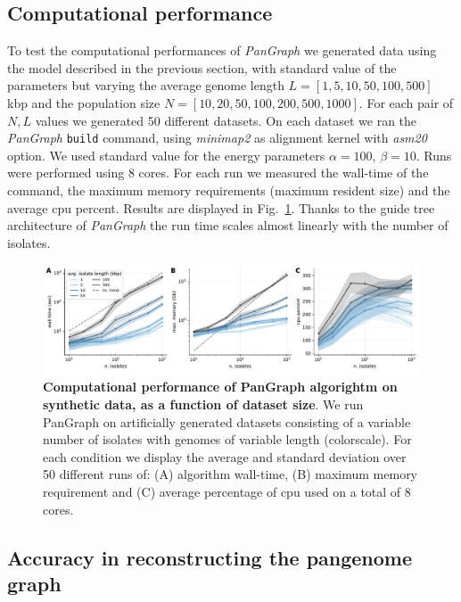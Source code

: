 \documentclass[aps,rmp,reprint,superscriptaddress,notitlepage,10pt,onecolumn]{revtex4-1}
\begin{document}
\subsection{Computational performance}

To test the computational performances of \textit{PanGraph} we generated data using the model described in the previous section, with standard value of the parameters but varying the average genome length $L=[1,5,10,50,100,500]$ kbp and the population size $N=[10,20,50,100,200,500,1000]$. For each pair of $N,L$ values we generated 50 different datasets. On each dataset we ran the \textit{PanGraph} \verb|build| command, using \textit{minimap2} as alignment kernel with \textit{asm20} option. We used standard value for the energy parameters $\alpha=100$, $\beta=10$. Runs were performed using 8 cores. For each run we measured the wall-time of the command, the maximum memory requirements (maximum resident size) and the average cpu percent. Results are displayed in Fig.~\ref{fig:benchmark-perf-suppl}.
Thanks to the guide tree architecture of \textit{PanGraph} the run time scales almost linearly with the number of isolates.

\begin{figure}[htb]
    \includegraphics[width=.9\textwidth]{figs_suppl/benchmark_suppl.pdf}
    \caption{{\bf Computational performance of PanGraph algorightm on synthetic data, as a function of dataset size}. We run PanGraph on artificially generated datasets consisting of a variable number of isolates with genomes of variable length (colorscale). For each condition we display the average and standard deviation over 50 different runs of: (A) algorithm wall-time, (B) maximum memory requirement and (C) average percentage of cpu used on a total of 8 cores.}
    \label{fig:benchmark-perf-suppl}
\end{figure}


\subsection{Accuracy in reconstructing the pangenome graph}
\end{document}
